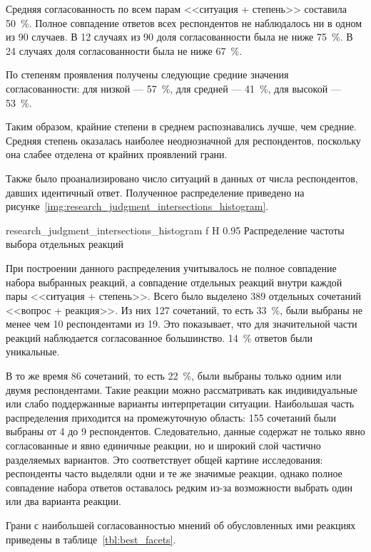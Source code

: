 Средняя согласованность по всем парам <<ситуация + степень>> составила
50~\%.
Полное совпадение ответов всех респондентов не наблюдалось ни в одном
из 90 случаев.
В 12 случаях из 90 доля согласованности была не ниже 75~\%.
В 24 случаях доля согласованности была не ниже 67~\%.

По степеням проявления получены следующие средние значения согласованности:
для низкой  --- 57~\%, для средней --- 41~\%, для высокой ---
53~\%.

Таким образом, крайние степени в среднем распознавались лучше, чем средние.
Средняя степень оказалась наиболее неоднозначной для респондентов, поскольку она слабее отделена от крайних проявлений грани.

Также было проанализировано число ситуаций в данных от числа респондентов, давших идентичный ответ.
Полученное распределение приведено на рисунке~\ref{img:research_judgment_intersections_histogram}.

{research_judgment_intersections_histogram}
{f}
{H}
{0.95\textwidth}
{Распределение частоты выбора отдельных реакций}

При построении данного распределения учитывалось не полное совпадение
набора выбранных реакций, а совпадение отдельных реакций внутри каждой
пары <<ситуация + степень>>.
Всего было выделено 389 отдельных сочетаний <<вопрос + реакция>>.
Из них 127 сочетаний, то есть 33~\%, были выбраны не менее чем 10
респондентами из 19.
Это показывает, что для значительной части реакций наблюдается
согласованное большинство.
14~\% ответов были уникальные.

В то же время 86 сочетаний, то есть 22~\%, были выбраны только одним
или двумя респондентами.
Такие реакции можно рассматривать как индивидуальные или слабо
поддержанные варианты интерпретации ситуации.
Наибольшая часть распределения приходится на промежуточную область:
155 сочетаний были выбраны от 4 до 9 респондентов.
Следовательно, данные содержат не только явно согласованные и явно
единичные реакции, но и широкий слой частично разделяемых вариантов.
Это соответствует общей картине исследования: респонденты часто
выделяли одни и те же значимые реакции, однако полное совпадение
набора ответов оставалось редким из-за возможности выбрать один или
два варианта реакции.

Грани с наибольшей согласованностью мнений об обусловленных ими реакциях приведены в таблице~\ref{tbl:best_facets}.


